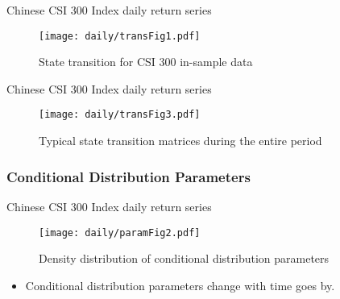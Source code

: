 \begin{frame}[fragile,t]{Chinese CSI 300 Index daily return series}
	\begin{figure}[!hbt]
    \center
    \texttt{[image: daily/transFig1.pdf]}
    \caption{State transition for CSI 300 in-sample data}
    \label{fig:CSI:transition}
    \end{figure}

\end{frame}

\begin{frame}[fragile]{Chinese CSI 300 Index daily return series}
	\begin{figure}[!hbt]
    \center
    \texttt{[image: daily/transFig3.pdf]}
    \caption{Typical state transition matrices during the entire period }
    \label{fig:CSI:transitiontypical}
    \end{figure}
\end{frame}

\subsubsection{Conditional Distribution Parameters}

\begin{frame}[fragile,t]{Chinese CSI 300 Index daily return series}
	\begin{figure}[!hbt]
    \center
    \texttt{[image: daily/paramFig2.pdf]}
    \caption{Density distribution of conditional distribution parameters}
    \label{fig:CSI:distdist}
    \end{figure}

    \vspace*{-1em}
	\begin{itemize}
	\item Conditional distribution parameters change with time goes by.
	\end{itemize}   
\end{frame}

